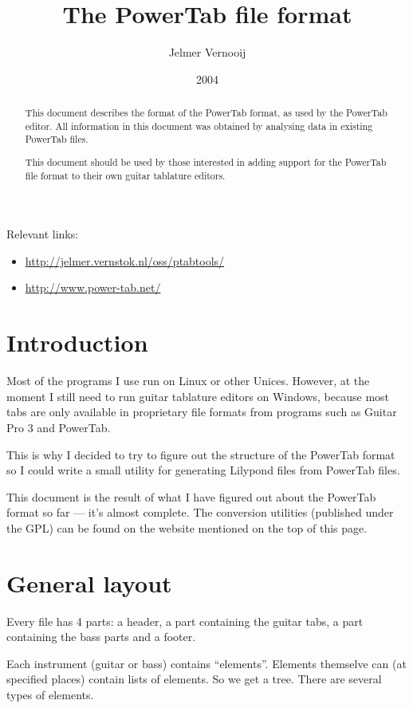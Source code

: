 \documentclass[a4paper]{article}
\begin{document}
\title{The PowerTab file format}
\date{2004}
\author{Jelmer Vernooij}
\maketitle

Relevant links:

\begin{itemize}
\item \url{http://jelmer.vernstok.nl/oss/ptabtools/}
\item \url{http://www.power-tab.net/}
\end{itemize}

\begin{abstract}
This document describes the format of the PowerTab format, as 
used by the PowerTab editor. All information 
in this document was obtained by analysing data in existing PowerTab files.

This document should be used by those interested in adding support 
for the PowerTab file format to their own guitar tablature editors.
\end{abstract}

\section{Introduction}

Most of the programs I use run on Linux or other Unices. However, 
at the moment I still need to run guitar tablature editors on Windows, 
because most tabs are only available in proprietary file formats from 
programs such as Guitar Pro 3 and PowerTab.

This is why I decided to try to figure out the structure of the PowerTab 
format so I could write a small utility for generating Lilypond files 
from PowerTab files.

This document is the result of what I have figured out about the PowerTab 
format so far --- it's almost complete. The conversion utilities 
(published under the GPL) can be found on the website mentioned on the top of 
this page.

\section{General layout}

Every file has 4 parts: a header, a part containing the guitar tabs, a 
part containing the bass parts and a footer.

Each instrument (guitar or bass) contains ``elements''. Elements themselve can 
(at specified places) contain lists of elements. So we get a tree. 
There are several types of elements.
\end{document}
